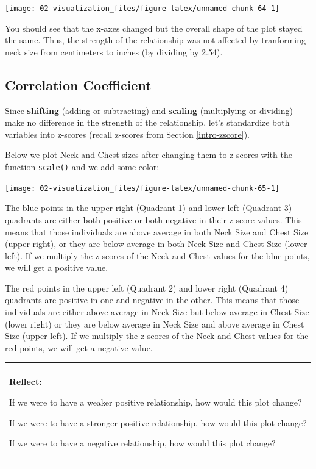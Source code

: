 \documentclass[
]{book}
\newenvironment{reflect}
{
    \begin{center}
    
    \begin{tabular}{|p{0.8\textwidth}|}
    \rowcolor{LightBlue}
    \hline\\
    \rowcolor{LightBlue}
    \textbf{Reflect:}
}
{
    \\\rowcolor{LightBlue}
    \\\hline
    \end{tabular} 
    \end{center}
}
\begin{document}
\begin{center}\texttt{[image: 02-visualization\_files/figure-latex/unnamed-chunk-64-1]} \end{center}

You should see that the x-axes changed but the overall shape of the plot stayed the same. Thus, the strength of the relationship was not affected by tranforming neck size from centimeters to inches (by dividing by 2.54).

\subsection{Correlation Coefficient}\label{correlation-coefficient}

Since \textbf{shifting} (adding or subtracting) and \textbf{scaling} (multiplying or dividing) make no difference in the strength of the relationship, let's standardize both variables into z-scores (recall z-scores from Section \ref{intro-zscore}).

Below we plot Neck and Chest sizes after changing them to z-scores with the function \texttt{scale()} and we add some color:

\begin{center}\texttt{[image: 02-visualization\_files/figure-latex/unnamed-chunk-65-1]} \end{center}

The blue points in the upper right (Quadrant 1) and lower left (Quadrant 3) quadrants are either both positive or both negative in their z-score values. This means that those individuals are above average in both Neck Size and Chest Size (upper right), or they are below average in both Neck Size and Chest Size (lower left). If we multiply the z-scores of the Neck and Chest values for the blue points, we will get a positive value.

The red points in the upper left (Quadrant 2) and lower right (Quadrant 4) quadrants are positive in one and negative in the other. This means that those individuals are either above average in Neck Size but below average in Chest Size (lower right) or they are below average in Neck Size and above average in Chest Size (upper left). If we multiply the z-scores of the Neck and Chest values for the red points, we will get a negative value.

\begin{reflect}
If we were to have a weaker positive relationship, how would this plot
change?

If we were to have a stronger positive relationship, how would this plot
change?

If we were to have a negative relationship, how would this plot change?
\end{reflect}
\end{document}
